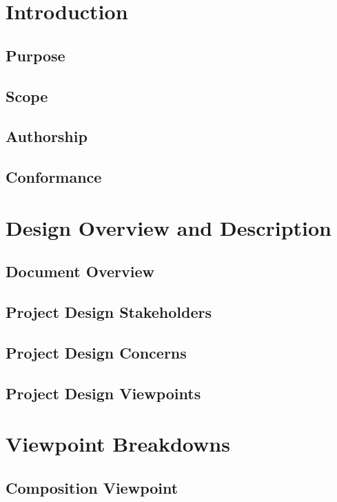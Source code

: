 \documentclass[onecolumn, draftclsnofoot,10pt, compsoc]{IEEEtran}
\begin{document}
        
        \section{Introduction}
        \subsection{Purpose}
        \subsection{Scope}
        \subsection{Authorship}
        \subsection{Conformance}
       
        \section{Design Overview and Description}
        \subsection{Document Overview}
        \subsection{Project Design Stakeholders}
        \subsection{Project Design Concerns}
        \subsection{Project Design Viewpoints}
        
        \section{Viewpoint Breakdowns}
        
        \subsection{Composition Viewpoint}
\end{document}
